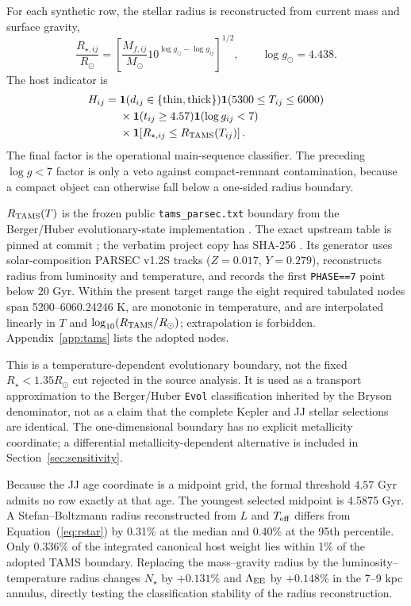 For each synthetic row, the stellar radius is reconstructed from current mass and surface gravity,
\begin{equation}
 \frac{R_{\star,ij}}{R_\odot}
 =\left[
 \frac{M_{f,ij}}{M_\odot}
 10^{\log g_\odot-\log g_{ij}}
 \right]^{1/2},
 \qquad \log g_\odot=4.438.
 \label{eq:rstar}
\end{equation}
The host indicator is
\begin{align}
 H_{ij}={}&
 \mathbf{1}(d_{ij}\in\{\mathrm{thin},\mathrm{thick}\})
 \mathbf{1}(5300\leq T_{ij}\leq6000)\nonumber\\
 &\times\mathbf{1}(t_{ij}\geq4.57)
 \mathbf{1}(\log g_{ij}<7)\nonumber\\
 &\times\mathbf{1}\!\left[R_{\star,ij}\leq
 R_{\rm TAMS}(T_{ij})\right].
 \label{eq:host_indicator}
\end{align}
The final factor is the operational main-sequence classifier. The preceding $\log g<7$ factor is only a veto against compact-remnant contamination, because a compact object can otherwise fall below a one-sided radius boundary.

$R_{\rm TAMS}(T)$ is the frozen public \texttt{tams\_parsec.txt} boundary from the Berger/Huber evolutionary-state implementation \citep{Berger2018,HuberEvolstate}. The exact upstream table is pinned at commit ; the verbatim project copy has SHA-256 . Its generator uses solar-composition PARSEC v1.2S tracks ($Z=0.017$, $Y=0.279$), reconstructs radius from luminosity and temperature, and records the first \texttt{PHASE==7} point below 20 Gyr. Within the present target range the eight required tabulated nodes span 5200--6060.24246 K, are monotonic in temperature, and are interpolated linearly in $T$ and $\log_{10}(R_{\rm TAMS}/R_\odot)$; extrapolation is forbidden. Appendix~\ref{app:tams} lists the adopted nodes.

This is a temperature-dependent evolutionary boundary, not the fixed $R_\star<1.35R_\odot$ cut rejected in the source analysis. It is used as a transport approximation to the Berger/Huber \texttt{Evol} classification inherited by the Bryson denominator, not as a claim that the complete Kepler and JJ stellar selections are identical. The one-dimensional boundary has no explicit metallicity coordinate; a differential metallicity-dependent alternative is included in Section~\ref{sec:sensitivity}.

Because the JJ age coordinate is a midpoint grid, the formal threshold $4.57$ Gyr admits no row exactly at that age. The youngest selected midpoint is 4.5875 Gyr. A Stefan--Boltzmann radius reconstructed from $L$ and $T_{\rm eff}$ differs from Equation~(\ref{eq:rstar}) by 0.31\% at the median and 0.40\% at the 95th percentile. Only 0.336\% of the integrated canonical host weight lies within 1\% of the adopted TAMS boundary. Replacing the mass--gravity radius by the luminosity--temperature radius changes $N_\star$ by $+0.131\%$ and $\Lambda_{\rm EE}$ by $+0.148\%$ in the 7--9 kpc annulus, directly testing the classification stability of the radius reconstruction.

